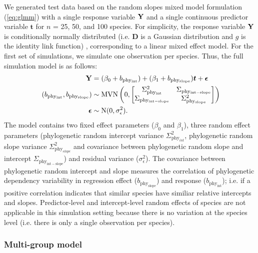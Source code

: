 \documentclass[12pt]{article}
\begin{document}
We generated test data based on the random slopes mixed model formulation (\ref{eq:glmm}) with a single response variable ${\mathbf Y}$ and a single continuous predictor variable $\bm{t}$ for $n$ = 25, 50, and 100 species.
For simplicity, the response variable ${\mathbf Y}$ is conditionally normally distributed (i.e. $\bm{D}$ is a Gaussian distribution and $g$ is the identity link function) , corresponding to a linear mixed effect model. 
For the first set of simulations, we simulate one observation per species.
Thus, the full simulation model is as follows:
\begin{equation}
\begin{aligned}
{\mathbf Y} & = (\beta_0 + b_{\mathrm{phy_{int}}}) + (\beta_1 + b_{\mathrm{phy_{slope}}}) \bm{t} + {\boldsymbol \epsilon} \\\
(b_{\mathrm{phy_{int}}}, b_{\mathrm{phy_{slope}}}) & \sim \textrm{MVN} \left( 0, \begin{bmatrix}
\Sigma^2_{\mathrm{phy_{int}}} & \Sigma_{\mathrm{phy_{int-slope}}} \\ 
\Sigma_{\mathrm{phy_{int-slope}}} & \Sigma^2_{\mathrm{phy_{slope}}}
\end{bmatrix} 
\right) \\ 
{\boldsymbol \epsilon} & \sim \textrm{N} ( 0 , \sigma_{\epsilon}^2) .
\label{eq:single_glmm}
\end{aligned}
\end{equation}
The model contains two fixed effect parameters ($\beta_0$ and $\beta_1$), three random effect parameters (phylogenetic random intercept variance $\Sigma^2_{\mathrm{phy}_{int}}$, phylogenetic random slope variance $\Sigma^2_{\mathrm{phy}_{slope}}$ and covariance between phylogenetic random slope and intercept $\Sigma_{\mathrm{phy_{int-slope}}}$) and residual variance ($\sigma_{\epsilon}^2$).  
The covariance between phylogenetic random intercept and slope measures the correlation of phylogenetic dependency variability in regression effect ($b_{\mathrm{phy_{slope}}}$) and response ($b_{\mathrm{phy_{int}}}$); i.e. if a positive correlation indicates that similar species have similiar relative intercepts and slopes.
Predictor-level and intercept-level random effects of species are not applicable in this simulation setting because there is no variation at the species level (i.e. there is only a single observation per species).

\subsubsection*{Multi-group model}
\end{document}
